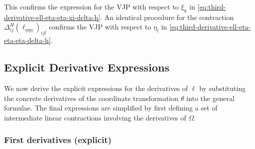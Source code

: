 \documentclass{article}
\begin{document}
%
This confirms the expression for the VJP with respect to $\xi_k$ in \cref{eq:third-derivative-ell-eta-eta-xi-delta-h}.
An identical procedure for the contraction $\Delta^H_{ij} (\ell_{\eta\eta\eta})_{ijl}$ confirms the VJP with respect to $\eta_l$ in \cref{eq:third-derivative-ell-eta-eta-eta-delta-h}.

\subsection{Explicit Derivative Expressions}\label{app:explict-derivative-expressions}

We now derive the explicit expressions for the derivatives of $\ell$ by substituting the concrete derivatives of the coordinate transformation $\theta$ into the general formulae.
The final expressions are simplified by first defining a set of intermediate linear contractions involving the derivatives of $\Omega$.

\subsubsection{First derivatives (explicit)}
\end{document}
